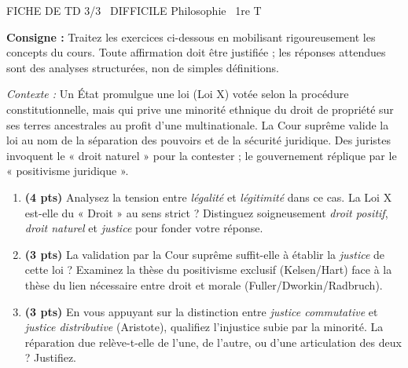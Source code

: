 \documentclass[11pt]{article}
\begin{document}
\begin{tcolorbox}[enhanced,colback=popink,colframe=popink,arc=10pt,boxrule=0pt,left=12pt,right=12pt,top=9pt,bottom=9pt]
{\color{white}\popxbold\small FICHE DE TD 3/3 \textbullet\ DIFFICILE \hfill Philosophie \textbullet\ 1re T\par}
\end{tcolorbox}
\vspace{4pt}
\noindent\textbf{Consigne :} Traitez les exercices ci-dessous en mobilisant rigoureusement les concepts du cours. Toute affirmation doit être justifiée ; les réponses attendues sont des analyses structurées, non de simples définitions.

\begin{exercice}
\textit{Contexte :} Un État promulgue une loi (Loi X) votée selon la procédure constitutionnelle, mais qui prive une minorité ethnique du droit de propriété sur ses terres ancestrales au profit d'une multinationale. La Cour suprême valide la loi au nom de la séparation des pouvoirs et de la sécurité juridique. Des juristes invoquent le « droit naturel » pour la contester ; le gouvernement réplique par le « positivisme juridique ».
\begin{enumerate}
    \item \textbf{(4 pts)} Analysez la tension entre \textit{légalité} et \textit{légitimité} dans ce cas. La Loi X est-elle du « Droit » au sens strict ? Distinguez soigneusement \textit{droit positif}, \textit{droit naturel} et \textit{justice} pour fonder votre réponse.
    \item \textbf{(3 pts)} La validation par la Cour suprême suffit-elle à établir la \textit{justice} de cette loi ? Examinez la thèse du positivisme exclusif (Kelsen/Hart) face à la thèse du lien nécessaire entre droit et morale (Fuller/Dworkin/Radbruch).
    \item \textbf{(3 pts)} En vous appuyant sur la distinction entre \textit{justice commutative} et \textit{justice distributive} (Aristote), qualifiez l'injustice subie par la minorité. La réparation due relève-t-elle de l'une, de l'autre, ou d'une articulation des deux ? Justifiez.
\end{enumerate}
\end{exercice}
\end{document}
